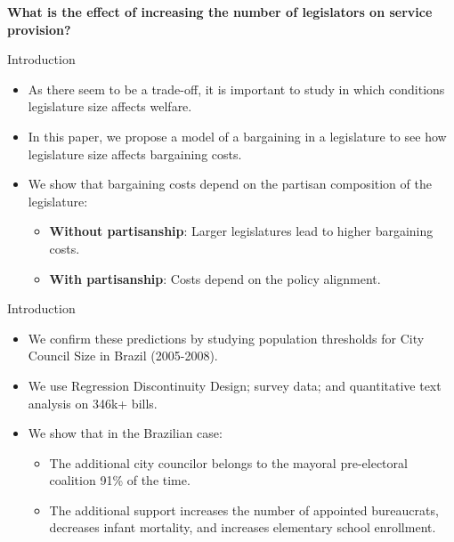 \documentclass[11pt]{beamer}
\begin{document}
\begin{frame}
\begin{center}
\Large{\textbf{What is the effect of increasing the number of legislators on service provision?}}
\end{center}
\end{frame}

\begin{frame}{Introduction}
  \begin{itemize} \itemsep1em
   \item As there seem to be a trade-off, it is important to study in which conditions legislature size affects welfare.
   \item In this paper, we propose a model of a bargaining in a legislature to see how legislature size affects bargaining costs.
   \item We show that bargaining costs depend on the partisan composition of the legislature:
   \begin{itemize} \itemsep1em
       \item \textbf{Without partisanship}: Larger legislatures lead to higher bargaining costs.
       \item \textbf{With partisanship}: Costs depend on the policy alignment.
   \end{itemize}
  \end{itemize}
\end{frame}

\begin{frame}{Introduction}
  \begin{itemize} \itemsep1em
   \item We confirm these predictions by studying population thresholds for City Council Size in Brazil (2005-2008).
   \item We use Regression Discontinuity Design; survey data; and quantitative text analysis on 346k+ bills.
   \item We show that in the Brazilian case:
   \begin{itemize} \itemsep1em
   \item The additional city councilor belongs to the mayoral pre-electoral coalition 91\% of the time.
   \item The additional support increases the number of appointed bureaucrats, decreases infant mortality, and increases elementary school enrollment.
   \end{itemize}
  \end{itemize}
\end{frame}
\end{document}
